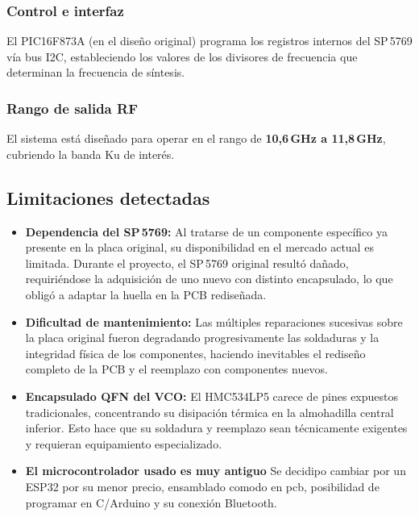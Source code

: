 \documentclass[12pt, a4paper]{article}
\begin{document}
	\subsubsection{Control e interfaz}
	El PIC16F873A (en el diseño original) programa los registros internos del SP\,5769 vía bus I2C,
	estableciendo los valores de los divisores de frecuencia que determinan la frecuencia de síntesis.
	
	\subsubsection{Rango de salida RF}
	El sistema está diseñado para operar en el rango de \textbf{10{,}6\,GHz a 11{,}8\,GHz}, cubriendo la
	banda Ku de interés.
	
	\subsection{Limitaciones detectadas}
	
	\begin{itemize}[leftmargin=*]
		\item \textbf{Dependencia del SP\,5769:} Al tratarse de un componente específico ya presente en la
		placa original, su disponibilidad en el mercado actual es limitada. Durante el proyecto, el
		SP\,5769 original resultó dañado, requiriéndose la adquisición de uno nuevo con distinto
		encapsulado, lo que obligó a adaptar la huella en la PCB rediseñada.
		\item \textbf{Dificultad de mantenimiento:} Las múltiples reparaciones sucesivas sobre la placa
		original fueron degradando progresivamente las soldaduras y la integridad física de los
		componentes, haciendo inevitables el rediseño completo de la PCB y el reemplazo con
		componentes nuevos.
		\item \textbf{Encapsulado QFN del VCO:} El HMC534LP5 carece de pines expuestos tradicionales,
		concentrando su disipación térmica en la almohadilla central inferior. Esto hace que su soldadura
		y reemplazo sean técnicamente exigentes y requieran equipamiento especializado.
		\item \textbf{El microcontrolador usado es muy antiguo} Se decidipo cambiar por un ESP32 por su menor precio, ensamblado comodo en pcb, posibilidad de programar en C/Arduino y su conexión Bluetooth.
	\end{itemize}
	
\end{document}
